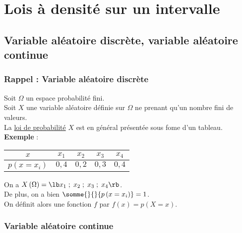 \ifdefined\COMPLETE
\else
    
    
\fi



\section{Lois à densité sur un intervalle}

\subsection{Variable aléatoire discrète, variable aléatoire continue}

\subsubsection{Rappel : Variable aléatoire discrète}

Soit $\Omega$ un espace probabilité fini. \\
Soit $X$ une variable aléatoire définie sur $\Omega$ ne prenant qu'un nombre fini de valeurs. \\

La \underline{loi de probabilité} $X$ est en général présentée sous fome d'un tableau. \\

\textbf{Exemple} : \\

\begin{tabular}{|c|c|c|c|c|}
\hline
$x$ & $x_1$ & $x_2$ & $x_3$ & $x_4$ \\
\hline
$p\left(x=x_i\right)$ & $0,4$ & $0,2$ & $0,3$ & $0,4$ \\
\hline 
\end{tabular}

\vspace*{.7cm}

On a $X\left(\Omega\right) = \lb x_1 \; ; \; x_2 \; ; \; x_3 \; ; \; x_4 \rb$. \\

De plus, on a bien $\somme{}{}{p\left(x=x_i\right)} = 1$. \\

On définit alors une fonction $f$ par $f(x) = p\left(X=x\right)$.

\subsubsection{Variable aléatoire continue}

